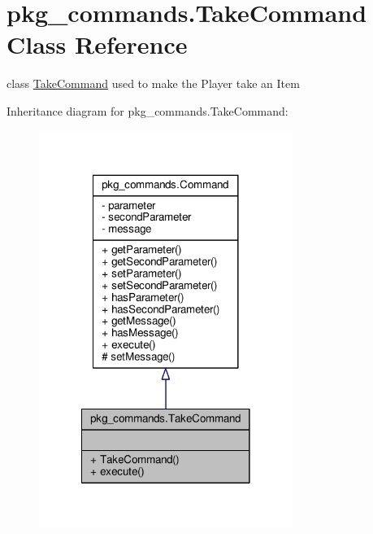 \hypertarget{classpkg__commands_1_1TakeCommand}{\section{pkg\-\_\-commands.\-Take\-Command Class Reference}
\label{classpkg__commands_1_1TakeCommand}
}


class \hyperlink{classpkg__commands_1_1TakeCommand}{Take\-Command} used to make the Player take an Item  




Inheritance diagram for pkg\-\_\-commands.\-Take\-Command\-:
\nopagebreak
\begin{figure}[H]
\begin{center}
\leavevmode
\includegraphics[width=234pt]{classpkg__commands_1_1TakeCommand__inherit__graph}
\end{center}
\end{figure}


